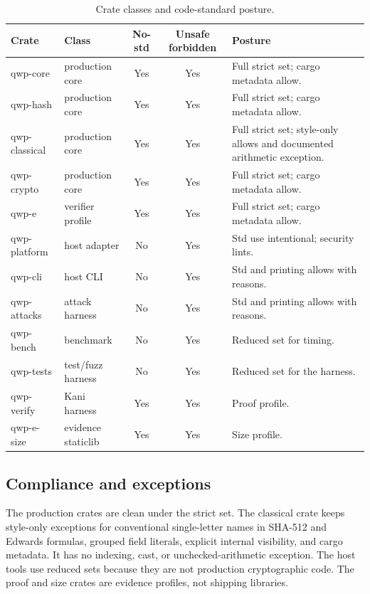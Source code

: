 \documentclass[11pt,a4paper]{article}
\theoremstyle{remark}
\begin{document}
\begin{table}[ht]
\centering
\caption{Crate classes and code-standard posture.}
\label{tab:crates}
\small
\begin{tabularx}{\textwidth}{@{}l l c c Y@{}}
\toprule
Crate & Class & No-std & Unsafe forbidden & Posture\\
\midrule
qwp-core & production core & Yes & Yes & Full strict set; cargo metadata allow.\\
qwp-hash & production core & Yes & Yes & Full strict set; cargo metadata allow.\\
qwp-classical & production core & Yes & Yes & Full strict set; style-only allows and documented arithmetic exception.\\
qwp-crypto & production core & Yes & Yes & Full strict set; cargo metadata allow.\\
qwp-e & verifier profile & Yes & Yes & Full strict set; cargo metadata allow.\\
qwp-platform & host adapter & No & Yes & Std use intentional; security lints.\\
qwp-cli & host CLI & No & Yes & Std and printing allows with reasons.\\
qwp-attacks & attack harness & No & Yes & Std and printing allows with reasons.\\
qwp-bench & benchmark & No & Yes & Reduced set for timing.\\
qwp-tests & test/fuzz harness & No & Yes & Reduced set for the harness.\\
qwp-verify & Kani harness & Yes & Yes & Proof profile.\\
qwp-e-size & evidence staticlib & Yes & Yes & Size profile.\\
\bottomrule
\end{tabularx}
\end{table}

\subsection{Compliance and exceptions}

The production crates are clean under the strict set. The classical crate keeps
style-only exceptions for conventional single-letter names in SHA-512 and
Edwards formulas, grouped field literals, explicit internal visibility, and
cargo metadata. It has no indexing, cast, or unchecked-arithmetic exception. The
host tools use reduced sets because they are not production cryptographic code.
The proof and size crates are evidence profiles, not shipping libraries.
\end{document}
